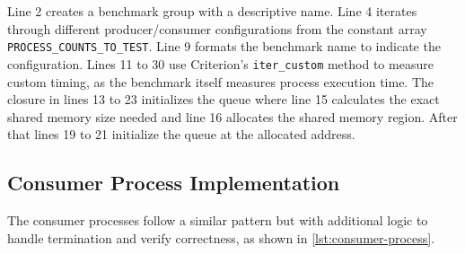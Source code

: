 Line 2 creates a benchmark group with a descriptive name. Line 4 iterates through different producer/consumer configurations from the constant array \texttt{PROCESS\_COUNTS\_TO\_TEST}. Line 9 formats the benchmark name to indicate the configuration. Lines 11 to 30 use Criterion's \texttt{iter\_custom} method to measure custom timing, as the benchmark itself measures process execution time. The closure in lines 13 to 23 initializes the queue where line 15 calculates the exact shared memory size needed and line 16 allocates the shared memory region. After that lines 19 to 21 initialize the queue at the allocated address.

\subsection{Consumer Process Implementation}
The consumer processes follow a similar pattern but with additional logic to handle termination and verify correctness, as shown in \cref{lst:consumer-process}.

